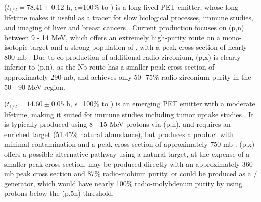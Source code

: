 \documentclass[3p]{elsarticle}
\begin{document}
 ($t_{1/2}=78.41\pm0.12$ h, $\epsilon$=100\% to   \cite{Singh2013}) is a long-lived PET emitter, whose long lifetime makes it useful as a tracer for slow biological processes, immune studies, and imaging of liver and  breast cancers \cite{Verel2003,Dijkers2009,Dijkers2010}.
Current production focuses on (p,n) between 9 - 14 MeV, which offers an extremely high-purity route on a mono-isotopic target and a strong population of , with a peak cross section of nearly 800 mb   \cite{PhysRevC.38.1624,Omara2009}.
Due to co-production of additional  radio-zirconium,  (p,x) is clearly inferior to  (p,n), as the Nb route has a smaller peak cross section of approximately 290 mb, and achieves only 50 -75\% radio-zirconium purity in the 50 - 90 MeV region.




 ($t_{1/2}=14.60 \pm 0.05$ h, $\epsilon$=100\% to   \cite{Browne1997}) is an emerging PET emitter with a moderate lifetime, making it suited for immune studies including tumor uptake studies    \cite{Busse2002,Radchenko2012}.
It is typically produced using 8 - 15 MeV protons via (p,n), and requires an enriched target (51.45\% natural abundance), but produces a product with minimal contamination and a peak cross section of approximately 750 mb  \cite{Busse2002}.
(p,x) offers a possible alternative pathway using a natural target, at the expense of a smaller peak cross section.
 may be produced directly with an approximately 360 mb peak cross section and 87\% radio-niobium purity, or could be produced as a / generator, which would have nearly 100\% radio-molybdenum purity by using protons below the (p,5n) threshold.
\end{document}
